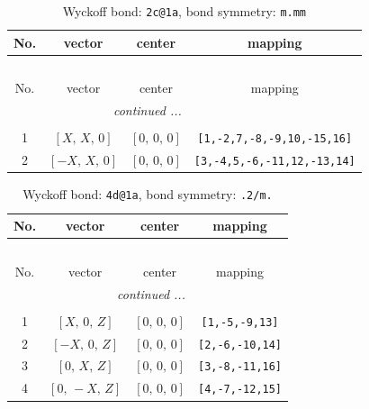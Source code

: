 \documentclass[fleqn,8pt]{jsarticle}
\begin{document}
\renewcommand{\arraystretch}{1.2}
\begin{longtable}{cccc}
\caption{Wyckoff bond: {\tt 2c@1a}, bond symmetry: {\tt m.mm}}
 \\
 \hline \hline
No. & vector & center & mapping \\ \hline \endfirsthead

\multicolumn{3}{l}{\tablename\ \thetable{}} \\
 \hline \hline
No. & vector & center & mapping \\ \hline \endhead

 \hline \hline
\multicolumn{3}{r}{\footnotesize\it continued ...} \\ \endfoot

 \hline \hline
\multicolumn{3}{r}{} \\ \endlastfoot

1 & $\left[ X,\, X,\, 0 \right]$ & $\left[ 0,\, 0,\, 0 \right]$ & {\tt [1,-2,7,-8,-9,10,-15,16]} \\ \hline
2 & $\left[ - X,\, X,\, 0 \right]$ & $\left[ 0,\, 0,\, 0 \right]$ & {\tt [3,-4,5,-6,-11,12,-13,14]} \\
\end{longtable}
\renewcommand{\arraystretch}{1.2}
\begin{longtable}{cccc}
\caption{Wyckoff bond: {\tt 4d@1a}, bond symmetry: {\tt .2/m.}}
 \\
 \hline \hline
No. & vector & center & mapping \\ \hline \endfirsthead

\multicolumn{3}{l}{\tablename\ \thetable{}} \\
 \hline \hline
No. & vector & center & mapping \\ \hline \endhead

 \hline \hline
\multicolumn{3}{r}{\footnotesize\it continued ...} \\ \endfoot

 \hline \hline
\multicolumn{3}{r}{} \\ \endlastfoot

1 & $\left[ X,\, 0,\, Z \right]$ & $\left[ 0,\, 0,\, 0 \right]$ & {\tt [1,-5,-9,13]} \\ \hline
2 & $\left[ - X,\, 0,\, Z \right]$ & $\left[ 0,\, 0,\, 0 \right]$ & {\tt [2,-6,-10,14]} \\ \hline
3 & $\left[ 0,\, X,\, Z \right]$ & $\left[ 0,\, 0,\, 0 \right]$ & {\tt [3,-8,-11,16]} \\ \hline
4 & $\left[ 0,\, - X,\, Z \right]$ & $\left[ 0,\, 0,\, 0 \right]$ & {\tt [4,-7,-12,15]} \\
\end{longtable}
\end{document}

